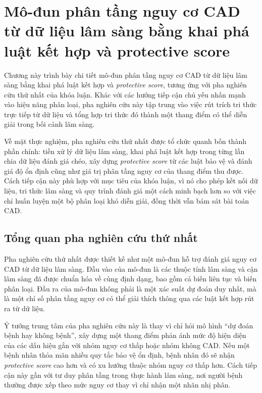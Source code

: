 \clearpage
{}

\setcounter{chapter}{1}
\chapter[{MÔ-ĐUN PHÂN TẦNG NGUY CƠ CAD TỪ DỮ LIỆU LÂM SÀNG BẰNG KHAI PHÁ LUẬT KẾT HỢP VÀ PROTECTIVE SCORE}]{Mô-đun phân tầng nguy cơ CAD từ dữ liệu lâm sàng bằng khai phá luật kết hợp và protective score}

Chương này trình bày chi tiết mô-đun phân tầng nguy cơ CAD từ dữ liệu lâm sàng bằng khai phá luật kết hợp và \textit{protective score}, tương ứng với pha nghiên cứu thứ nhất của khóa luận. Khác với các hướng tiếp cận chủ yếu nhấn mạnh vào hiệu năng phân loại, pha nghiên cứu này tập trung vào việc rút trích tri thức trực tiếp từ dữ liệu và tổng hợp tri thức đó thành một thang điểm có thể diễn giải trong bối cảnh lâm sàng.

\blocksep

Về mặt thực nghiệm, pha nghiên cứu thứ nhất được tổ chức quanh bốn thành phần chính: tiền xử lý dữ liệu lâm sàng, khai phá luật kết hợp trong từng lần chia dữ liệu đánh giá chéo, xây dựng \textit{protective score} từ các luật bảo vệ và đánh giá độ ổn định cũng như giá trị phân tầng nguy cơ của thang điểm thu được. Cách tiếp cận này phù hợp với mục tiêu của khóa luận, vì nó cho phép kết nối dữ liệu, tri thức lâm sàng và quy trình đánh giá một cách minh bạch hơn so với việc chỉ huấn luyện một bộ phân loại khó diễn giải, đồng thời vẫn bám sát bài toán CAD.

\blocksep

\section{Tổng quan pha nghiên cứu thứ nhất}

\blocksep

Pha nghiên cứu thứ nhất được thiết kế như một mô-đun hỗ trợ đánh giá nguy cơ CAD từ dữ liệu lâm sàng. Đầu vào của mô-đun là các thuộc tính lâm sàng và cận lâm sàng đã được chuẩn hóa về cùng định dạng, bao gồm cả biến liên tục và biến phân loại. Đầu ra của mô-đun không phải là một xác suất dự đoán duy nhất, mà là một chỉ số phân tầng nguy cơ có thể giải thích thông qua các luật kết hợp rút ra từ dữ liệu.

\blocksep

Ý tưởng trung tâm của pha nghiên cứu này là thay vì chỉ hỏi mô hình “dự đoán bệnh hay không bệnh”, xây dựng một thang điểm phản ánh mức độ hiện diện của các dấu hiệu gắn với nhóm nguy cơ thấp hoặc nhóm không CAD. Nếu một bệnh nhân thỏa mãn nhiều quy tắc bảo vệ ổn định, bệnh nhân đó sẽ nhận \textit{protective score} cao hơn và có xu hướng thuộc nhóm nguy cơ thấp hơn. Cách tiếp cận này gần với tư duy phân tầng trong thực hành lâm sàng, nơi người bệnh thường được xếp theo mức nguy cơ thay vì chỉ nhận một nhãn nhị phân.

